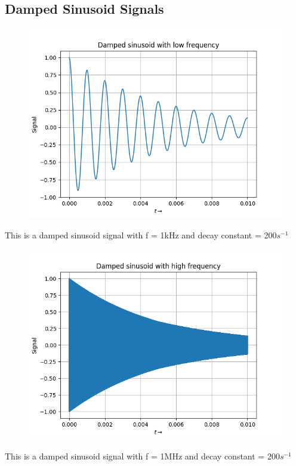 \documentclass[12pt, a4paper]{article}
\begin{document}
\subsection{Damped Sinusoid Signals}
\vspace*{-0.5cm}
\begin{figure}[H]
    \centering
    \includegraphics[scale = 0.8]{Figure_11.png}
    \label{fig:sample}
\end{figure}
\begin{center}
    This is a damped sinusoid signal with f = 1kHz and decay constant = 200$s^{-1}$
\end{center}
\vspace*{-0.5cm}
\begin{figure}[H]
    \centering
    \includegraphics[scale = 0.8]{Figure_12.png}
    \label{fig:sample}
\end{figure}
\begin{center}
    This is a damped sinusoid signal with f = 1MHz and decay constant = 200$s^{-1}$
\end{center}
\end{document}
